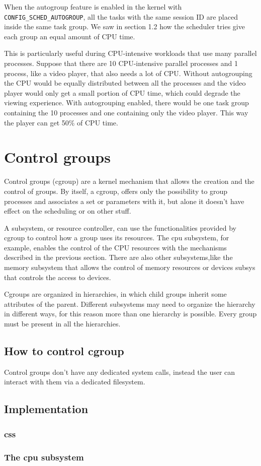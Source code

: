 When the autogroup feature is enabled in the kernel with \verb|CONFIG_SCHED_AUTOGROUP|, all the tasks with the same session ID are placed inside the same task group. We saw in section 1.2 how the scheduler tries give each group an equal amount of CPU time.

This is particularly useful during CPU-intensive workloads that use many parallel processes. Suppose that there are 10 CPU-intensive parallel processes and 1 process, like a video player, that also needs a lot of CPU. Without autogrouping the CPU would be equally distributed between all the processes and  the video player would only get a small portion of CPU time, which could degrade the viewing experience. With autogrouping enabled, there would be one task group containing the 10 processes and one containing only the video player. This way the player can get 50\% of CPU time.



\section{Control groups}

Control groups (cgroup) are a kernel mechanism that allows the creation and the control of groups. By itself, a cgroup, offers only the possibility to group processes and associates a set or parameters with it, but alone it doesn't have effect on the scheduling or on other stuff.

A subsystem, or resource controller, can use the functionalities provided by cgroup to control how a group uses its resources. The cpu subsystem, for example, enables the control of the CPU resources with the mechanisms described in the previous section. There are also other subsystems,like the memory subsystem that allows the control of memory resources or devices subsys that controls the access to devices.

Cgroups are organized in hierarchies, in which child groups inherit some attributes of the parent. Different subsystems may need to organize the hierarchy in different ways, for this reason more than one hierarchy is possible. Every group must be present in all the hierarchies.

\subsection{How to control cgroup}
Control groups don't have any dedicated system calls, instead the user can interact with them via a dedicated filesystem.

\subsection{Implementation}

\subsubsection{css}

\subsubsection{The cpu subsystem}

